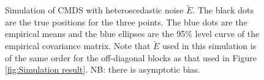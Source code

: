 \begin{figure}[tp]
    \centering
    \quad
    \quad
    \quad
    \caption{Simulation of CMDS with heteroscedastic noise $\widetilde{E}$. The black dots are the true positions for the three points. The blue dots are the empirical means and the blue ellipses are the 95\% level curve of the empirical covariance matrix. Note that $\widetilde{E}$ used in this simulation is of the same order for the off-diagonal blocks as that used in Figure \ref{fig:Simulation result}. NB: there is asymptotic bias.}
    \label{fig:Uncommon_var_E}
\end{figure}

